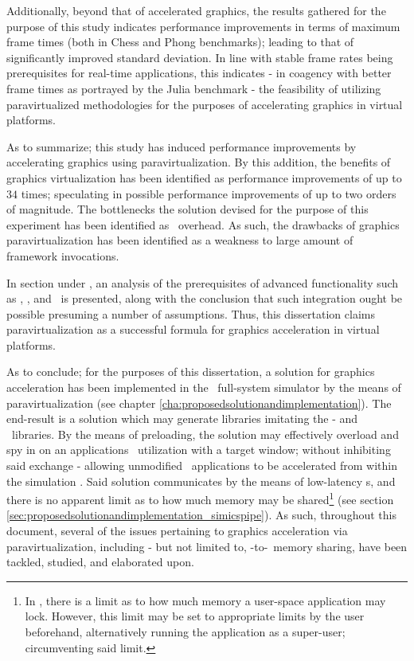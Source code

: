 Additionally, beyond that of accelerated graphics, the results gathered for the purpose of this study indicates performance improvements in terms of maximum frame times (both in Chess and Phong benchmarks); leading to that of significantly improved standard deviation.
In line with stable frame rates being prerequisites for real-time applications, this indicates - in coagency with better frame times as portrayed by the Julia benchmark - the feasibility of utilizing paravirtualized methodologies for the purposes of accelerating graphics in virtual platforms.

As to summarize; this study has induced performance improvements by accelerating graphics using paravirtualization.
By this addition, the benefits of graphics virtualization has been identified as performance improvements of up to $34$ times; speculating in possible performance improvements of up to two orders of magnitude.
The bottlenecks the solution devised for the purpose of this experiment has been identified as \dvttermmagicinstruction\ overhead.
As such, the drawbacks of graphics paravirtualization has been identified as a weakness to large amount of framework invocations.

In section  under , an analysis of the prerequisites of advanced functionality such as \dvttermdeterministicexecution , \dvttermcheckpointing, and \dvttermreverseexecution\ is presented, along with the conclusion that such integration ought be possible presuming a number of assumptions.
Thus, this dissertation claims paravirtualization as a successful formula for graphics acceleration in virtual platforms.

As to conclude; for the purposes of this dissertation, a solution for graphics acceleration has been implemented in the \dvttermsimics\ full-system simulator by the means of paravirtualization (see chapter \ref{cha:proposedsolutionandimplementation}).
The end-result is a solution which may generate libraries imitating the \dvttermegl - and \dvttermopenglestwopointo\ libraries.
By the means of preloading, the solution may effectively overload and spy in on an applications \dvttermegl\ utilization with a target window; without inhibiting said exchange - allowing unmodified \dvttermopengl\ applications to be accelerated from within the simulation \dvttermtarget .
Said solution communicates by the means of low-latency \dvttermmagicinstruction s, and there is no apparent limit as to how much memory may be shared\footnote{In \dvttermlinux , there is a limit as to how much memory a user-space application may lock. However, this limit may be set to appropriate limits by the user beforehand, alternatively running the application as a super-user; circumventing said limit.} (see section \ref{sec:proposedsolutionandimplementation_simicspipe}).
As such, throughout this document, several of the issues pertaining to graphics acceleration via paravirtualization, including - but not limited to, \dvttermtarget -to-\dvttermhost\ memory sharing, have been tackled, studied, and elaborated upon.

